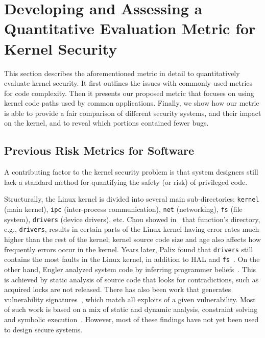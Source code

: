 \section{Developing and Assessing a Quantitative Evaluation Metric for
Kernel Security}
\label{sec.metric}
 
This section describes the aforementioned metric in detail to 
quantitatively evaluate kernel security. It first outlines the issues with
commonly used metrics for code complexity. Then it presents our proposed metric that
focuses on using kernel code paths used by common applications. Finally, we
show how our metric is able to provide a fair comparison of 
different security systems, and their impact on the kernel, 
and to reveal which portions contained fewer bugs.

\subsection{Previous Risk Metrics for Software}

A contributing factor to the kernel security problem is that system
designers 
still lack a standard method for quantifying the safety (or risk) of
privileged code.   


Structurally, the Linux kernel is divided into several main sub-directories:
\texttt{kernel} (main kernel), \texttt{ipc} (inter-process communication), 
\texttt{net} (networking), \texttt{fs} (file system), \texttt{drivers} (device drivers), 
etc. Chou showed in~\cite{PittSFIeld} that function's directory, e.g., 
\texttt{drivers}, results in certain parts of the Linux kernel having error rates much 
higher than the rest of the kernel; kernel source code size and age also affects
how frequently errors occur in the kernel.
Years later, Palix found that \texttt{drivers} still contains the most faults in 
the Linux kernel, in addition to HAL and \texttt{fs}~\cite{palix2011faults}. 
On the other hand, Engler analyzed system code by inferring programmer 
beliefs~\cite{engler2001bugs}. This is achieved by static analysis
of source code that looks for contradictions, such as acquired locks are 
not released. There has also been work that generates vulnerability 
signatures~\cite{brumley2006towards}, which match all exploits
of a given vulnerability. Most of such work is based on a mix of static and
dynamic analysis, constraint solving and symbolic execution~\cite{chou2003static}.
However, most of these findings have not yet been used to design 
secure systems. 


